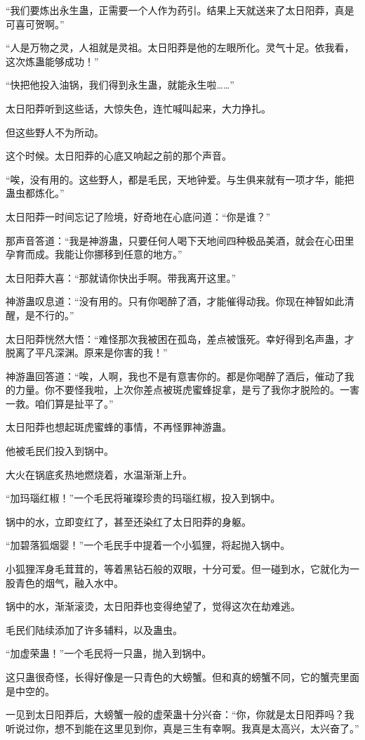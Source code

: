 \begin{this_body}
“我们要炼出永生蛊，正需要一个人作为药引。结果上天就送来了太日阳莽，真是可喜可贺啊。”

“人是万物之灵，人祖就是灵祖。太日阳莽是他的左眼所化。灵气十足。依我看，这次炼蛊能够成功！”

“快把他投入油锅，我们得到永生蛊，就能永生啦……”

太日阳莽听到这些话，大惊失色，连忙喊叫起来，大力挣扎。

但这些野人不为所动。

这个时候。太日阳莽的心底又响起之前的那个声音。

“唉，没有用的。这些野人，都是毛民，天地钟爱。与生俱来就有一项才华，能把蛊虫都炼化。”

太日阳莽一时间忘记了险境，好奇地在心底问道：“你是谁？”

那声音答道：“我是神游蛊，只要任何人喝下天地间四种极品美酒，就会在心田里孕育而成。我能让你挪移到任意的地方。”

太日阳莽大喜：“那就请你快出手啊。带我离开这里。”

神游蛊叹息道：“没有用的。只有你喝醉了酒，才能催得动我。你现在神智如此清醒，是不行的。”

太日阳莽恍然大悟：“难怪那次我被困在孤岛，差点被饿死。幸好得到名声蛊，才脱离了平凡深渊。原来是你害的我！”

神游蛊回答道：“唉，人啊，我也不是有意害你的。都是你喝醉了酒后，催动了我的力量。你不要怪我啦，上次你差点被斑虎蜜蜂捉拿，是亏了我你才脱险的。一害一救。咱们算是扯平了。”

太日阳莽也想起斑虎蜜蜂的事情，不再怪罪神游蛊。

他被毛民们投入到锅中。

大火在锅底炙热地燃烧着，水温渐渐上升。

“加玛瑙红椒！”一个毛民将璀璨珍贵的玛瑙红椒，投入到锅中。

锅中的水，立即变红了，甚至还染红了太日阳莽的身躯。

“加碧落狐烟婴！”一个毛民手中提着一个小狐狸，将起抛入锅中。

小狐狸浑身毛茸茸的，等着黑钻石般的双眼，十分可爱。但一碰到水，它就化为一股青色的烟气，融入水中。

锅中的水，渐渐滚烫，太日阳莽也变得绝望了，觉得这次在劫难逃。

毛民们陆续添加了许多辅料，以及蛊虫。

“加虚荣蛊！”一个毛民将一只蛊，抛入到锅中。

这只蛊很奇怪，长得好像是一只青色的大螃蟹。但和真的螃蟹不同，它的蟹壳里面是中空的。

一见到太日阳莽后，大螃蟹一般的虚荣蛊十分兴奋：“你，你就是太日阳莽吗？我听说过你，想不到能在这里见到你，真是三生有幸啊。我真是太高兴，太兴奋了。”


\end{this_body}
